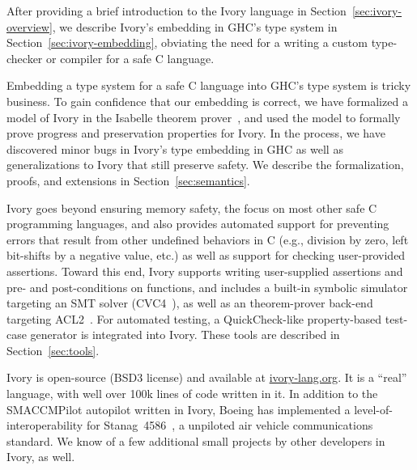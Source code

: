 After providing a brief introduction to the Ivory language in
Section~\ref{sec:ivory-overview}, we describe Ivory's embedding in GHC's type
system in Section~\ref{sec:ivory-embedding}, obviating the need for a writing a
custom type-checker or compiler for a safe C language.

Embedding a type system for a safe C language into GHC's type system is tricky
business. To gain confidence that our embedding is correct, we have formalized a
model of Ivory in the Isabelle theorem prover~\cite{isabelle}, and used the model to
formally prove progress and preservation properties for Ivory. In the process,
we have discovered minor bugs in Ivory's type embedding in GHC as well as
generalizations to Ivory that still preserve safety. We describe the
formalization, proofs, and extensions in Section~\ref{sec:semantics}.

Ivory goes beyond ensuring memory safety, the focus on most other safe C
programming languages, and also provides automated support for preventing errors
that result from other undefined behaviors in C (e.g., division by zero, left
bit-shifts by a negative value, etc.) as well as support for checking
user-provided assertions. Toward this end, Ivory supports writing user-supplied
assertions and pre- and post-conditions on functions, and includes a built-in
symbolic simulator targeting an SMT solver (CVC4~\cite{cvc4}), as well as an
theorem-prover back-end targeting ACL2~\cite{acl2}. For automated testing, a
QuickCheck-like property-based test-case generator is integrated into
Ivory. These tools are described in Section~\ref{sec:tools}.

Ivory is open-source (BSD3 license) and available at \url{ivory-lang.org}. It is
a ``real'' language, with well over 100k lines of code written in it. In
addition to the SMACCMPilot autopilot written in Ivory, Boeing has implemented a
level-of-interoperability for Stanag~4586~\cite{stanag}, a unpiloted air vehicle
communications standard. We know of a few additional small projects by other
developers in Ivory, as well.
